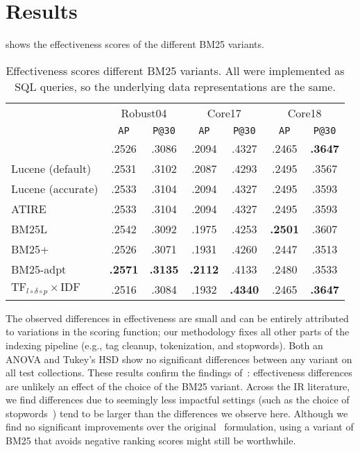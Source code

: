 \section{Results}
 shows the effectiveness scores of the different BM25 variants.  
\begin{table}
	\centering
	\caption{Effectiveness scores different BM25 variants. All were implemented as SQL queries, so the underlying data representations are the same.}
	\label{bm25_variant_results}
	\begin{tabular}{l c c c c c c}
		\toprule
		&\multicolumn{2}{c}{Robust04}&\multicolumn{2}{c}{Core17}&\multicolumn{2}{c}{Core18}\\
		&\texttt{AP}&\texttt{P@30}&\texttt{AP}&\texttt{P@30}&\texttt{AP}&\texttt{P@30}\\
		\midrule
		{\small \citeauthor{bm25-robertson}} & .2526 & .3086 & .2094 & .4327 & .2465 & \textbf{.3647} \\ 
		{\small Lucene (default)} & .2531 & .3102 & .2087 & .4293 & .2495 & .3567 \\ 
		{\small Lucene (accurate)} & .2533 & .3104 & .2094 & .4327 & .2495 & .3593 \\ 
		{\small ATIRE} & .2533 & .3104 & .2094 & .4327 & .2495 & .3593 \\ 
		{\small BM25L} & .2542 & .3092 & .1975 & .4253 & \textbf{.2501} & .3607 \\ 
		{\small BM25+} & .2526 & .3071 & .1931 & .4260 & .2447 & .3513 \\ 
		{\small BM25-adpt} & \textbf{.2571} & \textbf{.3135} & \textbf{.2112} & .4133 & .2480 & .3533\\ 
		{\small $\text{TF}_{l\circ\delta\circ p}\times\text{IDF}$} & .2516 & .3084 & .1932 & \textbf{.4340} & .2465 & \textbf{.3647}\\ 
		\bottomrule
	\end{tabular}
\end{table}
The observed differences in effectiveness are small and can be entirely attributed to variations in the scoring function; our methodology fixes all other parts of the indexing pipeline (e.g., tag cleanup, tokenization, and stopwords). Both an ANOVA and Tukey’s HSD show no significant differences between any variant on all test collections. These results confirm the findings of~\citet{trotman-bm25}: effectiveness differences are unlikely an effect of the choice of the BM25 variant. Across the IR literature, we find differences due to seemingly less impactful settings (such as the choice of stopwords~\citep{stopwords}) tend to be larger than the differences we observe here. Although we find no significant improvements over the original~\citep{bm25-robertson} formulation, using a variant of BM25 that avoids negative ranking scores might still be worthwhile.

